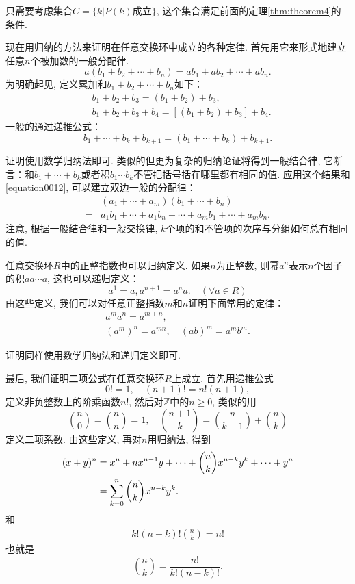 只需要考虑集合$C = \{k|P(k)\text{成立}\}$, 这个集合满足前面的定理\ref{thm:theorem4}的条件. 

现在用归纳的方法来证明在任意交换环中成立的各种定律. 首先用它来形式地建立任意$n$个被加数的一般分配律. 
\begin{equation}\label{equation0012}
a(b_1+b_2+\cdots+b_n) = ab_1+ab_2+\cdots+ab_n.
\end{equation}
为明确起见, 定义累加和$b_1+b_2+\cdots+b_n$如下：
\[
\begin{aligned}
&b_1+b_2+b_3 = (b_1+b_2)+b_3,\\
&b_1+b_2+b_3+b_4 = [(b_1+b_2)+b_3]+b_4.
\end{aligned}
\]
一般的通过递推公式：
\begin{equation}\label{equation0013}
b_1+\cdots+b_k+b_{k+1} = (b_1+\cdots+b_k) + b_{k+1}.
\end{equation}

证明使用数学归纳法即可. 类似的但更为复杂的归纳论证将得到一般结合律, 它断言：和$b_1+\cdots+b_k$或者积$b_1\cdots{}b_k$不管把括号括在哪里都有相同的值. 应用这个结果和\ref{equation0012}, 可以建立双边一般的分配律：
\[
\begin{aligned}
&(a_1+\cdots+a_m)(b_1+\cdots+b_n)\\
=&a_1b_1+\cdots+a_1b_n+\cdots+a_mb_1+\cdots+a_mb_n.
\end{aligned}
\]
注意, 根据一般结合律和一般交换律, $k$个项的和不管项的次序与分组如何总有相同的值. 

任意交换环$R$中的正整指数也可以归纳定义. 如果$n$为正整数, 则幂$a^n$表示$n$个因子的积$aa\cdots{}a$, 这也可以递归定义：
\begin{equation}\label{equation0016}
a^1 = a, a^{n+1} = a^na. \quad(\forall a \in R)
\end{equation}由这些定义, 我们可以对任意正整指数$m$和$n$证明下面常用的定律：
\begin{gather}
a^ma^n=a^{m+n},\label{equation0017}\\
(a^m)^n = a^{mn},\quad (ab)^m=a^mb^m.\label{equation0018}
\end{gather}

证明同样使用数学归纳法和递归定义即可. 

最后, 我们证明二项公式在任意交换环$R$上成立. 首先用递推公式
\[
0!=1,\quad (n+1)!=n!(n+1),
\]
定义非负整数上的阶乘函数$n!$, 然后对$\mathbb{Z}$中的$n \ge 0$, 类似的用
\[
\binom{n}{0} = \binom{n}{n}=1, \quad \binom{n+1}{k} = \binom{n}{k-1} + \binom{n}{k} 
\]
定义二项系数. 由这些定义, 再对$n$用归纳法, 得到 %
\begin{align}\label{equation0019}
(x+y)^n &= x^n + nx^{n-1}y + \cdots + \binom{n}{k}x^{n-k}y^k + \cdots + y^n \notag \\
&=\sum_{k=0}^{n}{\binom{n}{k}x^{n-k}y^k}.
\end{align}
和
\begin{gather}\label{equation0020}
k!(n-k)!\binom{n}{k}=n!
\end{gather}
也就是
\[
{n \choose k} = \frac{n!}{k!(n-k)!}.
\]

